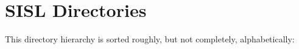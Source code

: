 \section{SISL Directories}
This directory hierarchy is sorted roughly, but not completely, alphabetically:\begin{CompactList}
\item {}
\end{CompactList}
